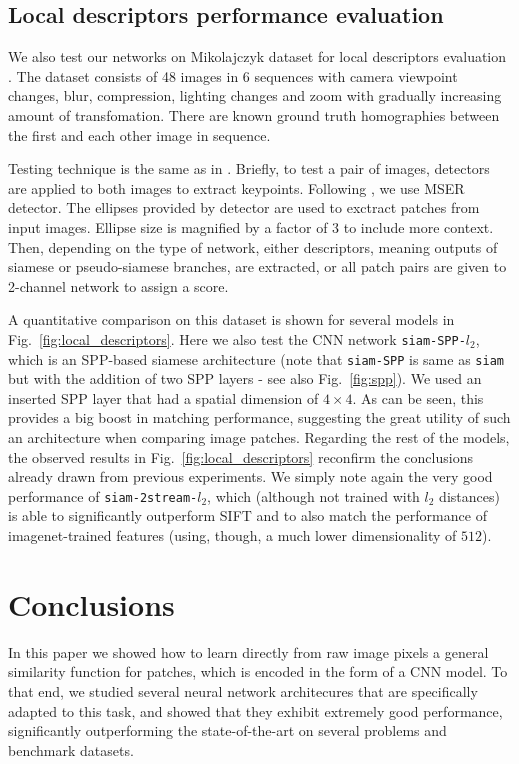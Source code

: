 \documentclass[10pt,twocolumn,letterpaper]{article}
\begin{document}
\subsection{Local descriptors performance evaluation}

We also test our networks on Mikolajczyk dataset for
local descriptors evaluation \cite{MS05}. The dataset consists of 48 images in 6 sequences
with camera viewpoint changes, blur, compression, lighting changes and zoom
with gradually increasing amount of transfomation. There are known ground 
truth homographies between the first and each other image in sequence.


Testing technique is the same as in \cite{MS05}. 
Briefly, to test a pair of images, detectors are applied
to both images to extract keypoints. Following \cite{comparison}, we use 
MSER detector. 
The ellipses provided by detector are used
to exctract patches from input images. Ellipse size is magnified by a factor of 3
to include more context.
Then, depending on the  type of network, either descriptors, meaning outputs of siamese
or pseudo-siamese branches, are extracted, or all patch pairs are given to 2-channel
network to assign a score.

A quantitative comparison  on this dataset is shown for several models in Fig.~\ref{fig:local_descriptors}.
Here we also test the CNN network  \texttt{siam-SPP-}$l_2$, which is an SPP-based siamese architecture (note that \texttt{siam-SPP} is same as \texttt{siam} but with the addition of two SPP layers - see also Fig.~\ref{fig:spp}). We used an inserted SPP layer that had a spatial dimension of $4\times 4$. As can be seen, this  provides a 
big boost in matching performance,  suggesting the great utility of such an architecture  
when comparing image patches. 
Regarding the rest  of the  models, the observed results in Fig.~\ref{fig:local_descriptors} reconfirm the conclusions already drawn  from  previous experiments. We simply note again the very good performance of \texttt{siam-2stream-}$l_2$, which (although not trained with $l_2$ distances) is able to significantly outperform SIFT and to also match the performance of imagenet-trained features (using, though, a much lower dimensionality of $512$).


\section{Conclusions}
In this paper we showed how to  learn  directly from raw image pixels a  general similarity function for patches, which is encoded in the form of a CNN model.  To that end, we studied  several neural network architecures  that are specifically  adapted to this task, and showed that they exhibit extremely good performance, significantly outperforming the state-of-the-art on several problems and benchmark datasets.
\end{document}
